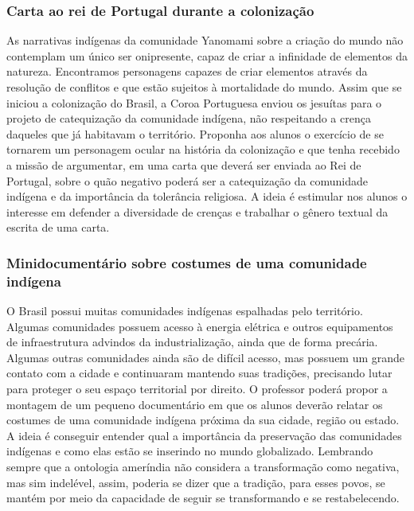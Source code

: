 \documentclass[12pt]{extarticle}
\begin{document}
\subsubsection{Carta ao rei de Portugal durante a colonização}


  As narrativas indígenas da comunidade Yanomami sobre a criação do
  mundo não contemplam um único ser onipresente, capaz de criar a
  infinidade de elementos da natureza. Encontramos personagens capazes
  de criar elementos através da resolução de conflitos e que estão sujeitos
  à mortalidade do mundo. Assim que se iniciou a colonização do Brasil,
  a Coroa Portuguesa enviou os jesuítas para o projeto de catequização
  da comunidade indígena, não respeitando a crença daqueles que já
  habitavam o território. Proponha aos alunos o exercício de se tornarem
  um personagem ocular na história da colonização e que tenha recebido a
  missão de argumentar, em uma carta que deverá ser enviada ao Rei de
  Portugal, sobre o quão negativo poderá ser a catequização da
  comunidade indígena e da importância da tolerância religiosa. A ideia
  é estimular nos alunos o interesse em defender a diversidade de crenças
  e trabalhar o gênero textual da escrita de uma carta.


\subsubsection{Minidocumentário sobre costumes de uma comunidade indígena}


  O Brasil possui muitas comunidades indígenas espalhadas pelo
  território. Algumas comunidades possuem acesso à energia elétrica e
  outros equipamentos de infraestrutura advindos da industrialização, ainda que de forma
  precária. Algumas outras comunidades ainda são de difícil acesso, mas
  possuem um grande contato com a cidade e continuaram mantendo suas
  tradições, precisando lutar para proteger o seu espaço territorial por
  direito. O professor poderá propor a montagem de um pequeno
  documentário em que os alunos deverão relatar os costumes de uma
  comunidade indígena próxima da sua cidade, região ou estado. A ideia é
  conseguir entender qual a importância da preservação das comunidades
  indígenas e como elas estão se inserindo no mundo globalizado. Lembrando sempre que 
  a ontologia ameríndia não considera a transformação como negativa, mas sim indelével, assim, 
  poderia se dizer que a tradição, para esses povos, se mantém por meio da capacidade de seguir
  se transformando e se restabelecendo.
\end{document}
